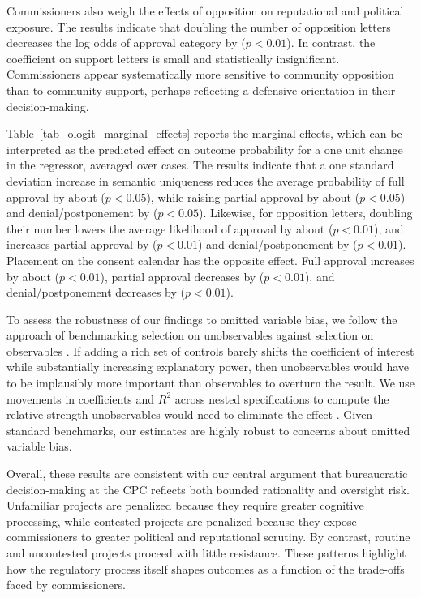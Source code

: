 Commissioners also weigh the effects of opposition on reputational and political exposure. The results indicate that doubling the number of opposition letters decreases the log odds of approval category by  ($p<0.01$). In contrast, the coefficient on support letters is small and statistically insignificant. Commissioners appear systematically more sensitive to community opposition than to community support, perhaps reflecting a defensive orientation in their decision-making.

Table~\ref{tab_ologit_marginal_effects} reports the marginal effects, which can be interpreted as the predicted effect on outcome probability for a one unit change in the regressor, averaged over cases. 
The results indicate that a one standard deviation increase in semantic uniqueness reduces the average probability of full approval by about  ($p<0.05$), while raising partial approval by about  ($p<0.05$) and denial/postponement by  ($p<0.05$). Likewise, for opposition letters, doubling their number lowers the average likelihood of approval by about  ($p<0.01$), and increases partial approval by  ($p<0.01$) and denial/postponement by  ($p<0.01$). Placement on the consent calendar has the opposite effect. Full approval increases by about  ($p<0.01$), partial approval decreases by  ($p<0.01$), and denial/postponement decreases by  ($p<0.01$).

To assess the robustness of our findings to omitted variable bias, we follow the approach of benchmarking selection on unobservables against selection on observables \citep{AltonjiElderTaber2005}. If adding a rich set of controls barely shifts the coefficient of interest while substantially increasing explanatory power, then unobservables would have to be implausibly more important than observables to overturn the result. We use movements in coefficients and $R^2$ across nested specifications to compute the relative strength unobservables would need to eliminate the effect \citep{Oster2019}. Given standard benchmarks, our estimates are highly robust to concerns about omitted variable bias.

Overall, these results are consistent with our central argument that bureaucratic decision-making at the CPC reflects both bounded rationality and oversight risk. Unfamiliar projects are penalized because they require greater cognitive processing, while contested projects are penalized because they expose commissioners to greater political and reputational scrutiny. By contrast, routine and uncontested projects proceed with little resistance. These patterns highlight how the regulatory process itself shapes outcomes as a function of the trade-offs faced by commissioners.
